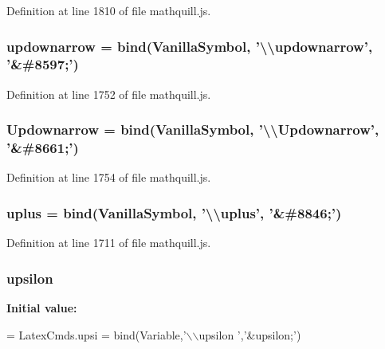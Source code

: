 Definition at line 1810 of file mathquill.\-js.

\subsubsection[{updownarrow}]{ updownarrow = {\bf bind}({\bf Vanilla\-Symbol}, '\textbackslash{}\textbackslash{}updownarrow', '\&\#8597;')}\label{mathquill_8js_aeb16b862e61f357d1e4c75dde33025de}


Definition at line 1752 of file mathquill.\-js.

\subsubsection[{Updownarrow}]{ Updownarrow = {\bf bind}({\bf Vanilla\-Symbol}, '\textbackslash{}\textbackslash{}Updownarrow', '\&\#8661;')}\label{mathquill_8js_a384fb9594fc23e81e894b1ad94bcd422}


Definition at line 1754 of file mathquill.\-js.

\subsubsection[{uplus}]{ uplus = {\bf bind}({\bf Vanilla\-Symbol}, '\textbackslash{}\textbackslash{}uplus', '\&\#8846;')}\label{mathquill_8js_ab2ea003ef70d05ea52b0e80d7aaa672c}


Definition at line 1711 of file mathquill.\-js.

\subsubsection[{upsilon}]{ upsilon}\label{mathquill_8js_a60997037058f91aace328747e7783413}
{\bfseries Initial value\-:}
\begin{DoxyCode}
= 
LatexCmds.upsi = 
  bind(Variable,\textcolor{stringliteral}{'\(\backslash\)\(\backslash\)upsilon '},\textcolor{stringliteral}{'&upsilon;'})
\end{DoxyCode}


